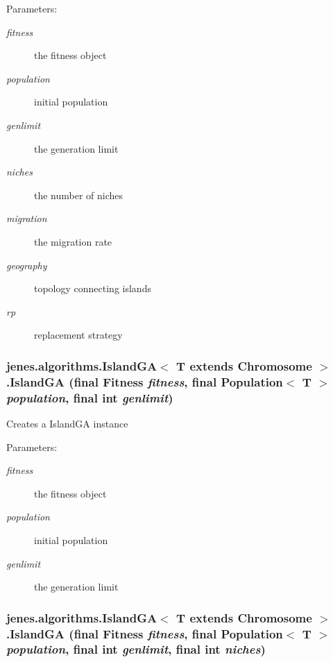 \begin{Desc}
\item[Parameters:]
\begin{description}
\item[{\em fitness}]the fitness object \item[{\em population}]initial population \item[{\em genlimit}]the generation limit \item[{\em niches}]the number of niches \item[{\em migration}]the migration rate \item[{\em geography}]topology connecting islands \item[{\em rp}]replacement strategy \end{description}
\end{Desc}
\hypertarget{classjenes_1_1algorithms_1_1_island_g_a_3_01_t_01extends_01_chromosome_01_4_baca651c904eb2d4a89380444c3dfd52}{
\subsubsection[IslandGA]{\setlength{\rightskip}{0pt plus 5cm}jenes.algorithms.IslandGA$<$ T extends Chromosome $>$.IslandGA (final Fitness {\em fitness}, \/  final Population$<$ T $>$ {\em population}, \/  final int {\em genlimit})}}
\label{classjenes_1_1algorithms_1_1_island_g_a_3_01_t_01extends_01_chromosome_01_4_baca651c904eb2d4a89380444c3dfd52}


Creates a IslandGA instance

\begin{Desc}
\item[Parameters:]
\begin{description}
\item[{\em fitness}]the fitness object \item[{\em population}]initial population \item[{\em genlimit}]the generation limit \end{description}
\end{Desc}
\hypertarget{classjenes_1_1algorithms_1_1_island_g_a_3_01_t_01extends_01_chromosome_01_4_462cff7f1ffe7db7a13ab925a8f85c50}{
\subsubsection[IslandGA]{\setlength{\rightskip}{0pt plus 5cm}jenes.algorithms.IslandGA$<$ T extends Chromosome $>$.IslandGA (final Fitness {\em fitness}, \/  final Population$<$ T $>$ {\em population}, \/  final int {\em genlimit}, \/  final int {\em niches})}}
\label{classjenes_1_1algorithms_1_1_island_g_a_3_01_t_01extends_01_chromosome_01_4_462cff7f1ffe7db7a13ab925a8f85c50}


